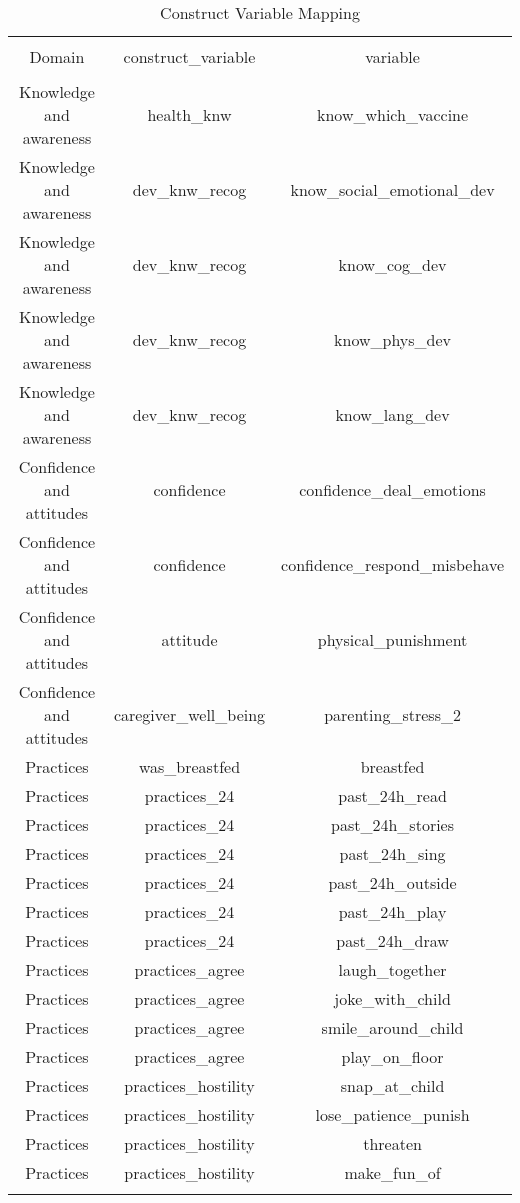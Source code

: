 
\begin{table}[!htbp] \centering 
  \caption{Construct Variable Mapping} 
  \label{tbl:Construct Variable Mapping} 
\begin{tabular}{@{\extracolsep{5pt}} ccc} 
\\[-1.8ex]\hline 
\hline \\[-1.8ex] 
Domain & construct\_variable & variable \\ 
\hline \\[-1.8ex] 
Knowledge and awareness & health\_knw & know\_which\_vaccine \\ 
Knowledge and awareness & dev\_knw\_recog & know\_social\_emotional\_dev \\ 
Knowledge and awareness & dev\_knw\_recog & know\_cog\_dev \\ 
Knowledge and awareness & dev\_knw\_recog & know\_phys\_dev \\ 
Knowledge and awareness & dev\_knw\_recog & know\_lang\_dev \\ 
Confidence and attitudes & confidence & confidence\_deal\_emotions \\ 
Confidence and attitudes & confidence & confidence\_respond\_misbehave \\ 
Confidence and attitudes & attitude & physical\_punishment \\ 
Confidence and attitudes & caregiver\_well\_being & parenting\_stress\_2 \\ 
Practices & was\_breastfed & breastfed \\ 
Practices & practices\_24 & past\_24h\_read \\ 
Practices & practices\_24 & past\_24h\_stories \\ 
Practices & practices\_24 & past\_24h\_sing \\ 
Practices & practices\_24 & past\_24h\_outside \\ 
Practices & practices\_24 & past\_24h\_play \\ 
Practices & practices\_24 & past\_24h\_draw \\ 
Practices & practices\_agree & laugh\_together \\ 
Practices & practices\_agree & joke\_with\_child \\ 
Practices & practices\_agree & smile\_around\_child \\ 
Practices & practices\_agree & play\_on\_floor \\ 
Practices & practices\_hostility & snap\_at\_child \\ 
Practices & practices\_hostility & lose\_patience\_punish \\ 
Practices & practices\_hostility & threaten \\ 
Practices & practices\_hostility & make\_fun\_of \\ 
\hline \\[-1.8ex] 
\end{tabular} 
\end{table} 
